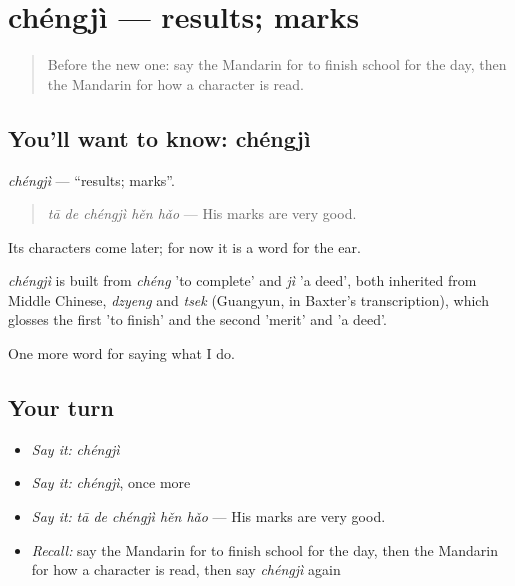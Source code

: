 \section[chéngjì]{chéngjì — results; marks}

\label{lesson:ZH-C249-chengji}



\begin{quote}
Before the new one: say the Mandarin for to finish school for the day, then the Mandarin for how a character is read.
\end{quote}

\subsection*{You'll want to know: chéngjì}
\emph{chéngjì} — \textquotedblleft{}results; marks\textquotedblright{}.

\begin{quote}
\emph{tā de chéngjì hěn hǎo} — His marks are very good.
\end{quote}

Its characters come later; for now it is a word for the ear.

\begin{cousinweb}
\emph{chéngjì} is built from \emph{chéng} 'to complete' and \emph{jì} 'a deed', both inherited from Middle Chinese, \emph{dzyeng} and \emph{tsek} (Guangyun, in Baxter's transcription), which glosses the first 'to finish' and the second 'merit' and 'a deed'.
\end{cousinweb}

\begin{grammarlens}[title={What you've built}]
One more word for saying what I do.
\end{grammarlens}

\subsection*{Your turn}
\begin{itemize}
\raggedright
  \item \emph{Say it:} \emph{chéngjì}
  \item \emph{Say it:} \emph{chéngjì}, once more
  \item \emph{Say it:} \emph{tā de chéngjì hěn hǎo} — His marks are very good.
  \item \emph{Recall:} say the Mandarin for to finish school for the day, then the Mandarin for how a character is read, then say \emph{chéngjì} again
\end{itemize}

